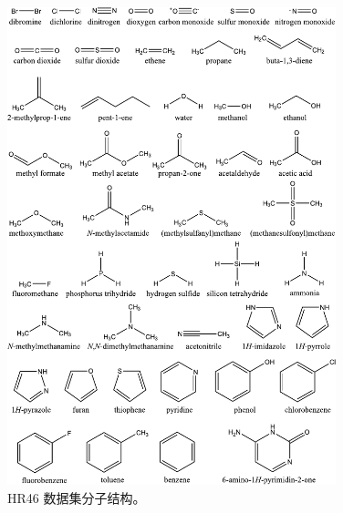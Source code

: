 \begin{figure}[H]
    \centering
    \caption{HR46 数据集分子结构。}
    \label{fig.fig-s1}
    \includegraphics[width=0.85\textwidth]{assets/fig-s1.pdf}
\end{figure}

